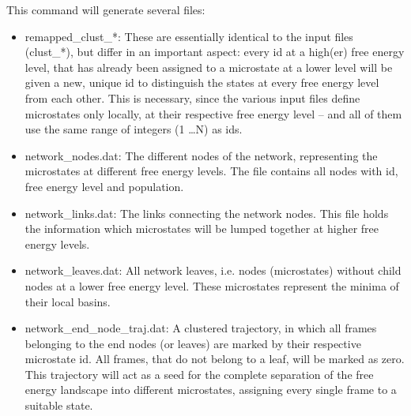 \documentclass[12pt,a4paper,twoside,english,fleqn]{article}
\begin{document}
This command will generate several files:
\begin{itemize}
  \item remapped\_clust\_*: These are essentially identical to the input files
                            (clust\_*), but differ in an important aspect:
                            every id at a high(er) free energy level,
                            that has already been assigned to a microstate at
                            a lower level will be given a new, unique id to
                            distinguish the states at every free energy level
                            from each other. This is necessary, since the
                            various input files define microstates only
                            locally, at their respective free energy level
                            -- and all of them use the same range of integers
                            (1 \dots N) as ids.
  \item network\_nodes.dat: The different nodes of the network, representing
                            the microstates at different free energy levels.
                            The file contains all nodes with id, free energy
                            level and population.
  \item network\_links.dat: The links connecting the network nodes. This file
                            holds the information which microstates will be
                            lumped together at higher free energy levels.
  \item network\_leaves.dat: All network leaves, i.e. nodes (microstates)
                             without child nodes at a lower free energy level. 
                             These microstates represent the minima of their
                             local basins.
  \item network\_end\_node\_traj.dat: A clustered trajectory, in which all
                                      frames belonging to the end nodes (or
                                      leaves) are marked by their respective
                                      microstate id. All frames, that do not
                                      belong to a leaf, will be marked as zero.
                                      This trajectory will act as a seed for
                                      the complete separation of the free
                                      energy landscape into different
                                      microstates, assigning every single frame
                                      to a suitable state.

\end{itemize}
\end{document}
